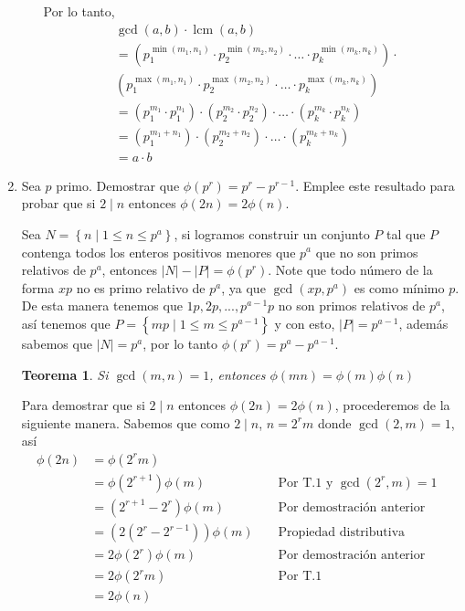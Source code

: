 \documentclass{report}
\newtheorem{theorem}{Teorema}
\begin{document}
\begin{enumerate}
\begin{enumerate}
            Por lo tanto,
            \begin{align*}
            & \gcd(a, b) \cdot \operatorname{lcm}(a, b) \\
            & = \left( p_1^{\min(m_1, n_1)} \cdot p_2^{\min(m_2, n_2)} \cdot \ldots \cdot p_k^{\min(m_k, n_k)} \right) \cdot \\
            & \left( p_1^{\max(m_1, n_1)} \cdot p_2^{\max(m_2, n_2)} \cdot \ldots \cdot p_k^{\max(m_k, n_k)} \right) \\
            & = \left( p_1^{m_1} \cdot p_1^{n_1} \right) \cdot \left( p_2^{m_2} \cdot p_2^{n_2} \right) \cdot \ldots \cdot \left( p_k^{m_k} \cdot p_k^{n_k} \right) \\
            & = \left( p_1^{m_1 + n_1} \right) \cdot \left( p_2^{m_2 + n_2} \right) \cdot \ldots \cdot \left( p_k^{m_k + n_k} \right) \\
            & = a \cdot b
            \end{align*}
        \end{enumerate}

        \item Sea $p$ primo. Demostrar que $\phi(p^r) = p^r-p^{r-1}$. Emplee este resultado para probar que si $2 \mid n$ entonces $\phi(2n) = 2\phi(n)$.

        Sea $N = \left\{ n \mid 1 \leq n \leq p^a \right\}$, si logramos construir un conjunto $P$ tal que $P$ contenga todos los enteros positivos menores que $p^a$ que no son primos relativos de $p^a$, entonces $\left|N\right| - \left|P\right| = \phi(p^r)$. Note que todo número de la forma $xp$ no es primo relativo de $p^a$, ya que $\gcd(xp, p^a)$ es como mínimo $p$. De esta manera tenemos que $1 p, 2 p, ..., p^{a-1}p$ no son primos relativos de $p^a$, así tenemos que $P = \left\{ mp \mid 1 \leq m \leq p^{a-1} \right\}$ y con esto, $\left|P\right| = p^{a-1}$, además sabemos que $\left|N\right| = p^a$, por lo tanto $\phi(p^r) = p^a - p^{a-1}$.

        \begin{theorem}
            Si $\gcd(m,n) = 1$, entonces $\phi(mn) = \phi(m)\phi(n)$
        \end{theorem}

        Para demostrar que si $2 \mid n$ entonces $\phi(2n) = 2\phi(n)$, procederemos de la siguiente manera. Sabemos que como $2 \mid n$, $n = 2^rm$ donde $\gcd(2, m) = 1$, así
        \begin{align*}
            \phi(2n) &= \phi(2^rm)\\
            &= \phi(2^{r+1})\phi(m) && \text{ Por T.1 y $\gcd(2^r,m) = 1$ }\\
            &= (2^{r+1}-2^r)\phi(m) && \text{ Por demostración anterior}\\
            &= (2(2^r-2^{r-1}))\phi(m) && \text{ Propiedad distributiva}\\
            &= 2\phi(2^r)\phi(m) && \text{ Por demostración anterior}\\
            &= 2\phi(2^rm) && \text{ Por T.1}\\
            &= 2\phi(n)
        \end{align*}


\end{enumerate}
\end{document}
